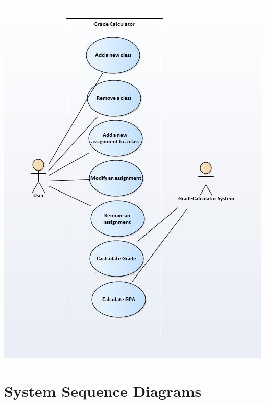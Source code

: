 \documentclass[12pt]{article}
\begin{document}
\includegraphics[width=\textwidth]{UseCaseDiagram}

\newpage

\section*{System Sequence Diagrams}
\end{document}

